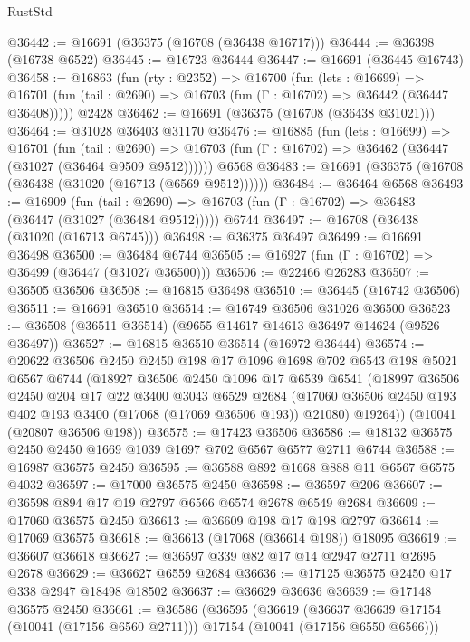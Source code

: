 \begin{lexlean}{RustStd}
\begin{coremodule}
@36442 := @16691 (@36375 (@16708 (@36438 @16717)))
@36444 := @36398 (@16738 @6522)
@36445 := @16723 @36444
@36447 := @16691 (@36445 @16743)
@36458 := @16863
    (fun (rty : @2352) =>
    @16700
      (fun (lets : @16699) =>
      @16701 (fun (tail : @2690) => @16703 (fun (Γ : @16702) => @36442 (@36447 @36408)))))
    @2428
@36462 := @16691 (@36375 (@16708 (@36438 @31021)))
@36464 := @31028 @36403 @31170
@36476 := @16885
    (fun (lets : @16699) =>
    @16701
      (fun (tail : @2690) =>
      @16703 (fun (Γ : @16702) => @36462 (@36447 (@31027 (@36464 @9509 @9512))))))
    @6568
@36483 := @16691 (@36375 (@16708 (@36438 (@31020 (@16713 (@6569 @9512))))))
@36484 := @36464 @6568
@36493 := @16909
    (fun (tail : @2690) => @16703 (fun (Γ : @16702) => @36483 (@36447 (@31027 (@36484 @9512)))))
    @6744
@36497 := @16708 (@36438 (@31020 (@16713 @6745)))
@36498 := @36375 @36497
@36499 := @16691 @36498
@36500 := @36484 @6744
@36505 := @16927 (fun (Γ : @16702) => @36499 (@36447 (@31027 @36500)))
@36506 := @22466 @26283
@36507 := @36505 @36506
@36508 := @16815 @36498
@36510 := @36445 (@16742 @36506)
@36511 := @16691 @36510
@36514 := @16749 @36506 @31026 @36500
@36523 := @36508 (@36511 @36514) (@9655 @14617 @14613 @36497 @14624 (@9526 @36497))
@36527 := @16815 @36510 @36514 (@16972 @36444)
@36574 := @20622
    @36506
    @2450
    @2450
    @198
    @17
    @1096
    @1698
    @702
    @6543
    @198
    @5021
    @6567
    @6744
    (@18927
      @36506
      @2450
      @1096
      @17
      @6539
      @6541
      (@18997
        @36506
        @2450
        @204
        @17
        @22
        @3400
        @3043
        @6529
        @2684
        (@17060 @36506 @2450 @193 @402 @193 @3400 (@17068 (@17069 @36506 @193)) @21080)
        @19264))
    (@10041 (@20807 @36506 @198))
@36575 := @17423 @36506
@36586 := @18132 @36575 @2450 @2450 @1669 @1039 @1697 @702 @6567 @6577 @2711 @6744
@36588 := @16987 @36575 @2450
@36595 := @36588 @892 @1668 @888 @11 @6567 @6575 @4032
@36597 := @17000 @36575 @2450
@36598 := @36597 @206
@36607 := @36598 @894 @17 @19 @2797 @6566 @6574 @2678 @6549 @2684
@36609 := @17060 @36575 @2450
@36613 := @36609 @198 @17 @198 @2797
@36614 := @17069 @36575
@36618 := @36613 (@17068 (@36614 @198)) @18095
@36619 := @36607 @36618
@36627 := @36597 @339 @82 @17 @14 @2947 @2711 @2695 @2678
@36629 := @36627 @6559 @2684
@36636 := @17125 @36575 @2450 @17 @338 @2947 @18498 @18502
@36637 := @36629 @36636
@36639 := @17148 @36575 @2450
@36661 := @36586
    (@36595
      (@36619
        (@36637 @36639 @17154 (@10041 (@17156 @6560 @2711)))
        @17154
        (@10041 (@17156 @6550 @6566)))

\end{coremodule}
\end{lexlean}
